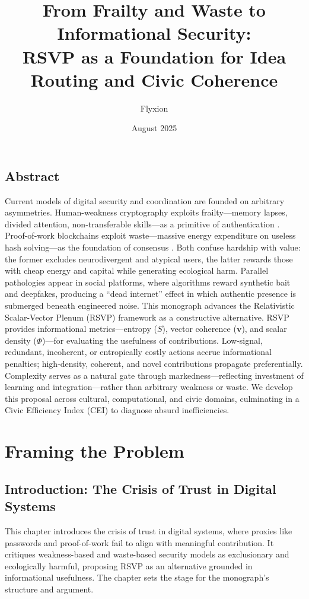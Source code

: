 \documentclass[openany]{book}
\title{From Frailty and Waste to Informational Security:\\ RSVP as a Foundation for Idea Routing and Civic Coherence}
\author{Flyxion}
\date{August 2025}
\begin{document}
\maketitle
{}

\chapter*{Abstract}
Current models of digital security and coordination are founded on arbitrary asymmetries. Human-weakness cryptography exploits frailty—memory lapses, divided attention, non-transferable skills—as a primitive of authentication \cite{conitzer2020}. Proof-of-work blockchains exploit waste—massive energy expenditure on useless hash solving—as the foundation of consensus \cite{nakamoto2008}. Both confuse hardship with value: the former excludes neurodivergent and atypical users, the latter rewards those with cheap energy and capital while generating ecological harm. Parallel pathologies appear in social platforms, where algorithms reward synthetic bait and deepfakes, producing a ``dead internet'' effect in which authentic presence is submerged beneath engineered noise. This monograph advances the Relativistic Scalar-Vector Plenum (RSVP) framework as a constructive alternative. RSVP provides informational metrics—entropy ($S$), vector coherence ($\mathbf{v}$), and scalar density ($\Phi$)—for evaluating the usefulness of contributions. Low-signal, redundant, incoherent, or entropically costly actions accrue informational penalties; high-density, coherent, and novel contributions propagate preferentially. Complexity serves as a natural gate through markedness—reflecting investment of learning and integration—rather than arbitrary weakness or waste. We develop this proposal across cultural, computational, and civic domains, culminating in a Civic Efficiency Index (CEI) to diagnose absurd inefficiencies.

\clearpage
{}
\tableofcontents
\clearpage
{}

\part{Framing the Problem}

\chapter{Introduction: The Crisis of Trust in Digital Systems}

This chapter introduces the crisis of trust in digital systems, where proxies like passwords and proof-of-work fail to align with meaningful contribution. It critiques weakness-based and waste-based security models as exclusionary and ecologically harmful, proposing RSVP as an alternative grounded in informational usefulness. The chapter sets the stage for the monograph's structure and argument.
\end{document}
